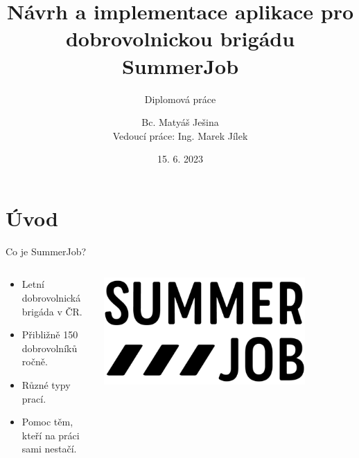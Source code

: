 \documentclass[czech,aspectratio=169]{beamer}
\title[Aplikace pro SummerJob]{Návrh a implementace aplikace pro dobrovolnickou brigádu SummerJob}
\subtitle{Diplomová práce}
\institute[FIT ČVUT v Praze]{Fakulta informačních technologií \\ České vysoké učení technické v Praze}
\author[M. Ješina]{Bc. Matyáš Ješina \\ Vedoucí práce: Ing. Marek Jílek}
\date{15. 6. 2023}
\begin{document}
  \begin{frame}
    \titlepage 
  \end{frame}
  

  \section{Úvod}
  \begin{frame}{Co je SummerJob?}
    \begin{columns}
      \begin{column}{.65\textwidth}
        \begin{itemize}
          \item Letní dobrovolnická brigáda v ČR.
          \item Přibližně 150 dobrovolníků ročně.
          \item Různé typy prací.
          \item Pomoc těm, kteří na práci sami nestačí.
        \end{itemize}
      \end{column}
      \begin{column}{.3\textwidth}
        \includegraphics[width=0.8\textwidth]{summerjob-logo}
      \end{column}
    \end{columns}
  \end{frame}
  
\end{document}
